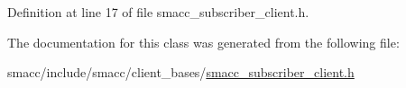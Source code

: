 Definition at line 17 of file smacc\+\_\+subscriber\+\_\+client.\+h.



The documentation for this class was generated from the following file\+:\begin{DoxyCompactItemize}
\item 
smacc/include/smacc/client\+\_\+bases/\hyperlink{smacc__subscriber__client_8h}{smacc\+\_\+subscriber\+\_\+client.\+h}\end{DoxyCompactItemize}

